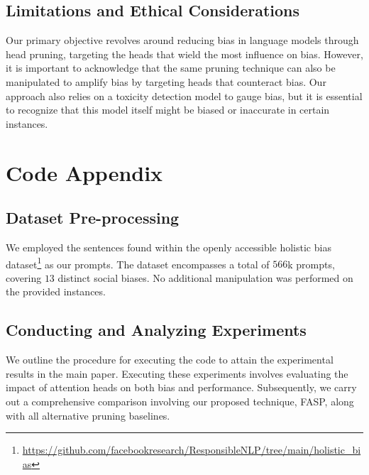 \documentclass[letterpaper]{article} %
\begin{document}
\subsection{Limitations and Ethical Considerations}
Our primary objective revolves around reducing bias in language models through head pruning, targeting the heads that wield the most influence on bias. However, it is important to acknowledge that the same pruning technique can also be manipulated to amplify bias by targeting heads that counteract bias. Our approach also relies on a toxicity detection model to gauge bias, but it is essential to recognize that this model itself might be biased or inaccurate in certain instances.
\section{Code Appendix}

\subsection{Dataset Pre-processing}
We employed the sentences found within the openly accessible holistic bias dataset\footnote{\url{https://github.com/facebookresearch/ResponsibleNLP/tree/main/holistic_bias}} as our prompts. The dataset encompasses a total of $566$k prompts, covering $13$ distinct social biases. No additional manipulation was performed on the provided instances.
\subsection{Conducting and Analyzing Experiments}
We outline the procedure for executing the code to attain the experimental results in the main paper. Executing these experiments involves evaluating the impact of attention heads on both bias and performance. Subsequently, we carry out a comprehensive comparison involving our proposed technique, FASP, along with all alternative pruning baselines.
\end{document}
